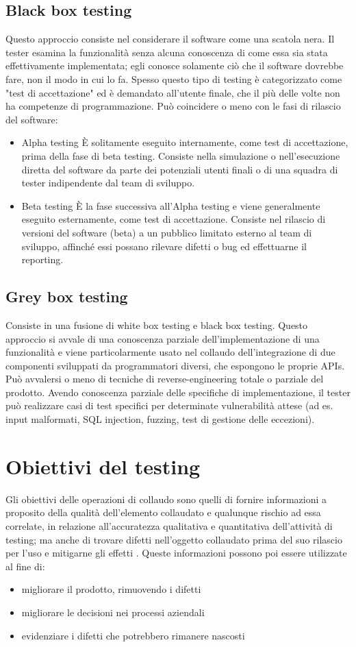 \documentclass[../main.tex]{subfiles}
\begin{document}
\subsection{Black box testing}
Questo approccio consiste nel considerare il software come una scatola nera.
Il tester esamina la funzionalità senza alcuna conoscenza di come essa sia stata effettivamente implementata; egli conosce solamente ciò che il software dovrebbe fare, non il modo in cui lo fa.
Spesso questo tipo di testing è categorizzato come "test di accettazione" ed è demandato all'utente finale, che il più delle volte non ha competenze di programmazione.
Può coincidere o meno con le fasi di rilascio del software:
\begin{itemize}
\item Alpha testing
\`E solitamente eseguito internamente, come test di accettazione, prima della fase di beta testing.
Consiste nella simulazione o nell'esecuzione diretta del software da parte dei potenziali utenti finali o di una squadra di tester indipendente dal team di sviluppo.
\item Beta testing
\`E la fase successiva all'Alpha testing e viene generalmente eseguito esternamente, come test di accettazione.
Consiste nel rilascio di versioni del software (beta) a un pubblico limitato esterno al team di sviluppo, affinché essi possano rilevare difetti o bug ed effettuarne il reporting.
\end{itemize}
\subsection{Grey box testing}
Consiste in una fusione di white box testing e black box testing.
Questo approccio si avvale di una conoscenza parziale dell'implementazione di una funzionalità e viene particolarmente usato nel collaudo dell'integrazione di due componenti sviluppati da programmatori diversi, che espongono le proprie APIs.
Può avvalersi o meno di tecniche di reverse-engineering totale o parziale del prodotto.
Avendo conoscenza parziale delle specifiche di implementazione, il tester può realizzare casi di test specifici per determinate vulnerabilità attese (ad es. input malformati, SQL injection, fuzzing, test di gestione delle eccezioni).
\section{Obiettivi del testing}
Gli obiettivi delle operazioni di collaudo sono quelli di fornire informazioni a proposito della qualità dell'elemento collaudato e qualunque rischio ad essa correlate, in relazione all'accuratezza qualitativa e quantitativa dell'attività di testing; ma anche di trovare difetti nell'oggetto collaudato prima del suo rilascio per l'uso e mitigarne gli effetti \cite{iso29119}.
Queste informazioni possono poi essere utilizzate al fine di:
\begin{itemize}
\item migliorare il prodotto, rimuovendo i difetti
\item migliorare le decisioni nei processi aziendali
\item evidenziare i difetti che potrebbero rimanere nascosti
\end{itemize}
\end{document}
